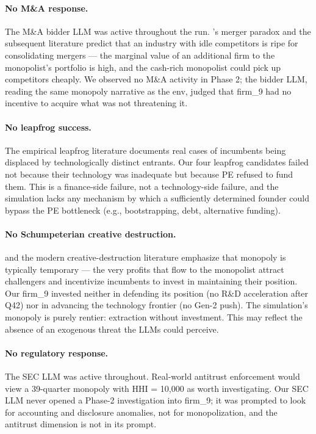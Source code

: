 \documentclass[11pt]{article}
\begin{document}
\paragraph{No M\&A response.} The M\&A bidder LLM was active throughout the run. \citet{SalantSwitzerReynolds1983}'s merger paradox and the subsequent literature \citep{FarrellShapiro1990} predict that an industry with idle competitors is ripe for consolidating mergers --- the marginal value of an additional firm to the monopolist's portfolio is high, and the cash-rich monopolist could pick up competitors cheaply. We observed no M\&A activity in Phase 2; the bidder LLM, reading the same monopoly narrative as the env, judged that firm\_9 had no incentive to acquire what was not threatening it.

\paragraph{No leapfrog success.} The empirical leapfrog literature \citep{FudenbergGilbertStiglitzTirole1983,VivesInnovation2008} documents real cases of incumbents being displaced by technologically distinct entrants. Our four leapfrog candidates failed not because their technology was inadequate but because PE refused to fund them. This is a finance-side failure, not a technology-side failure, and the simulation lacks any mechanism by which a sufficiently determined founder could bypass the PE bottleneck (e.g., bootstrapping, debt, alternative funding).

\paragraph{No Schumpeterian creative destruction.} \citet{Schumpeter1942} and the modern creative-destruction literature \citep{AghionHowitt1992,AghionEtAl2005} emphasize that monopoly is typically temporary --- the very profits that flow to the monopolist attract challengers and incentivize incumbents to invest in maintaining their position. Our firm\_9 invested neither in defending its position (no R\&D acceleration after Q42) nor in advancing the technology frontier (no Gen-2 push). The simulation's monopoly is purely rentier: extraction without investment. This may reflect the absence of an exogenous threat the LLMs could perceive.

\paragraph{No regulatory response.} The SEC LLM was active throughout. Real-world antitrust enforcement \citep{Whinston2007,KhanAmazon2017} would view a 39-quarter monopoly with HHI = 10{,}000 as worth investigating. Our SEC LLM never opened a Phase-2 investigation into firm\_9; it was prompted to look for accounting and disclosure anomalies, not for monopolization, and the antitrust dimension is not in its prompt.
\end{document}
